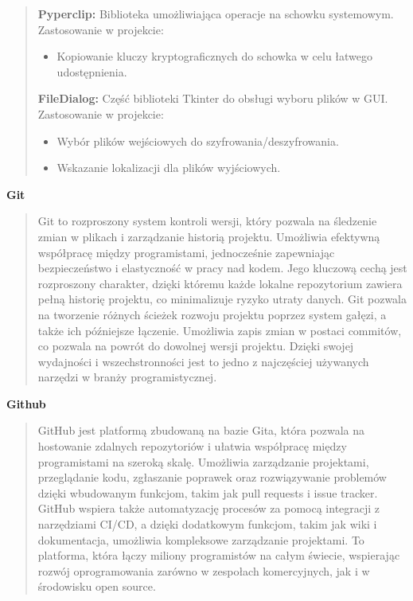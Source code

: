 \documentclass[12pt,a4paper]{article}
\begin{document}
\begin{quotation}
\noindent\textbf{Pyperclip:}
Biblioteka umożliwiająca operacje na schowku systemowym.\newline
Zastosowanie w projekcie:
\begin{itemize}
\item Kopiowanie kluczy kryptograficznych do schowka w celu łatwego udostępnienia.
\end{itemize}

\noindent\textbf{FileDialog:}
Część biblioteki Tkinter do obsługi wyboru plików w GUI.\newline
Zastosowanie w projekcie:
\begin{itemize}
\item Wybór plików wejściowych do szyfrowania/deszyfrowania.
\item Wskazanie lokalizacji dla plików wyjściowych.
\end{itemize}
\end{quotation}

\newpage
\noindent\textbf{Git}
\begin{quotation} \noindent Git to rozproszony system kontroli wersji, który pozwala na śledzenie zmian w plikach i zarządzanie historią projektu. Umożliwia efektywną współpracę między programistami, jednocześnie zapewniając bezpieczeństwo i elastyczność w pracy nad kodem. Jego kluczową cechą jest rozproszony charakter, dzięki któremu każde lokalne repozytorium zawiera pełną historię projektu, co minimalizuje ryzyko utraty danych. Git pozwala na tworzenie różnych ścieżek rozwoju projektu poprzez system gałęzi, a także ich późniejsze łączenie. Umożliwia zapis zmian w postaci commitów, co pozwala na powrót do dowolnej wersji projektu. Dzięki swojej wydajności i wszechstronności jest to jedno z najczęściej używanych narzędzi w branży programistycznej.
\end{quotation}

\noindent\textbf{Github}
\begin{quotation} \noindent GitHub jest platformą zbudowaną na bazie Gita, która pozwala na hostowanie zdalnych repozytoriów i ułatwia współpracę między programistami na szeroką skalę. Umożliwia zarządzanie projektami, przeglądanie kodu, zgłaszanie poprawek oraz rozwiązywanie problemów dzięki wbudowanym funkcjom, takim jak pull requests i issue tracker. GitHub wspiera także automatyzację procesów za pomocą integracji z narzędziami CI/CD, a dzięki dodatkowym funkcjom, takim jak wiki i dokumentacja, umożliwia kompleksowe zarządzanie projektami. To platforma, która łączy miliony programistów na całym świecie, wspierając rozwój oprogramowania zarówno w zespołach komercyjnych, jak i w środowisku open source.
\end{quotation}
\end{document}
